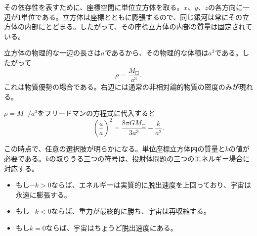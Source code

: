 その依存性を表すために、座標空間に単位立方体を取る。\(x\)、\(y\)、\(z\)の各方向に一辺が1単位である。立方体は座標とともに膨張するので、同じ銀河は常にその立方体の内部にとどまる。したがって、その座標立方体の内部の質量は固定されている。


立方体の物理的な一辺の長さは\(a\)であるから、その物理的な体積は\(a^3\)である。したがって
\begin{equation}
\rho=\frac{M_{\Box}}{a^3}.
\end{equation}
これは物質優勢の場合である。右辺には通常の非相対論的物質の密度のみが現れる。

\begin{classroomqa}
\end{classroomqa}

\(\rho=M_{\Box}/a^3\)をフリードマンの方程式に代入すると
\begin{equation}
\left(\frac{\dot a}{a}\right)^2=\frac{8\pi G M_{\Box}}{3a^3}-\frac{k}{a^2}.
\end{equation}

この時点で、任意の選択肢が明らかになる。単位座標立方体内の質量と\(k\)の値が必要である。\(k\)の取りうる三つの符号は、投射体問題の三つのエネルギー場合に対応する。

\begin{itemize}
\item もし\(-k>0\)ならば、エネルギーは実質的に脱出速度を上回っており、宇宙は永遠に膨張する。
\item もし\(-k<0\)ならば、重力が最終的に勝ち、宇宙は再収縮する。
\item もし\(k=0\)ならば、宇宙はちょうど脱出速度にある。
\end{itemize}

\begin{classroomqa}
\end{classroomqa}

